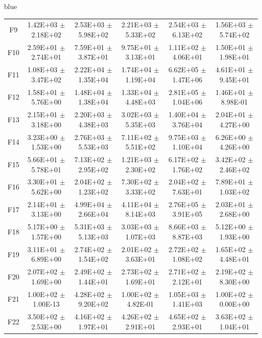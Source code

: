 \documentclass[journal, onecolumn]{IEEEtran}
\begin{document}
\begin{color}{blue}
\begin{table}[htbp!]
\begin{tabular}{c|ccccc}
		F9	 &	1.42E+03	$\pm$	2.18E+02		 &	2.53E+03	$\pm$	5.98E+02		 &	2.21E+03	$\pm$	5.33E+02		 &	2.54E+03	$\pm$	6.13E+02		 &	1.56E+03	$\pm$	5.74E+02	\\
		F10	 &	2.59E+01	$\pm$	2.74E+01		 &	7.59E+01	$\pm$	3.87E+01		 &	9.75E+01	$\pm$	3.13E+01		 &	1.11E+02	$\pm$	4.06E+01		 &	1.50E+01	$\pm$	1.98E+01	\\
		F11	 &	1.08E+03	$\pm$	3.47E+02		 &	2.22E+04	$\pm$	1.35E+04		 &	1.74E+04	$\pm$	1.19E+04		 &	6.62E+05	$\pm$	1.47E+06		 &	4.61E+01	$\pm$	9.45E+01	\\
		F12	 &	1.58E+01	$\pm$	5.76E+00		 &	1.48E+04	$\pm$	1.38E+04		 &	1.33E+04	$\pm$	4.48E+03		 &	2.81E+05	$\pm$	1.04E+06		 &	1.46E+01	$\pm$	8.98E-01	\\
		F13	 &	2.15E+01	$\pm$	3.18E+00		 &	2.20E+03	$\pm$	4.38E+03		 &	3.02E+03	$\pm$	5.35E+03		 &	1.40E+04	$\pm$	3.76E+04		 &	2.04E+01	$\pm$	4.27E+00	\\
		F14	 &	3.23E+00	$\pm$	1.53E+00		 &	2.76E+03	$\pm$	5.53E+03		 &	7.11E+02	$\pm$	5.51E+02		 &	9.75E+03	$\pm$	1.10E+04		 &	6.26E+00	$\pm$	4.26E+00	\\
		F15	 &	5.66E+01	$\pm$	5.78E+01		 &	7.13E+02	$\pm$	2.95E+02		 &	1.21E+03	$\pm$	2.30E+02		 &	6.17E+02	$\pm$	1.76E+02		 &	3.42E+02	$\pm$	2.46E+02	\\
		F16	 &	3.30E+01	$\pm$	5.62E+00		 &	2.04E+02	$\pm$	1.23E+02		 &	7.30E+02	$\pm$	3.33E+02		 &	2.04E+02	$\pm$	7.63E+01		 &	7.89E+01	$\pm$	1.03E+02	\\
		F17	 &	2.14E+01	$\pm$	3.13E+00		 &	4.99E+04	$\pm$	2.66E+04		 &	4.11E+04	$\pm$	8.14E+03		 &	2.76E+05	$\pm$	3.91E+05		 &	2.03E+01	$\pm$	2.68E+00	\\
		F18	 &	5.17E+00	$\pm$	1.57E+00		 &	5.31E+03	$\pm$	5.13E+03		 &	3.03E+03	$\pm$	1.07E+03		 &	8.66E+03	$\pm$	8.87E+03		 &	5.12E+00	$\pm$	1.93E+00	\\
		F19	 &	3.11E+01	$\pm$	6.89E+00		 &	2.74E+02	$\pm$	1.54E+02		 &	2.01E+02	$\pm$	3.63E+01		 &	2.72E+02	$\pm$	1.08E+02		 &	1.65E+02	$\pm$	4.48E+01	\\
		F20	 &	2.07E+02	$\pm$	1.69E+00		 &	2.49E+02	$\pm$	1.44E+01		 &	2.73E+02	$\pm$	1.69E+01		 &	2.71E+02	$\pm$	2.12E+01		 &	2.19E+02	$\pm$	8.30E+00	\\
		F21	 &	1.00E+02	$\pm$	1.00E-13		 &	4.28E+02	$\pm$	9.20E+02		 &	1.00E+02	$\pm$	4.82E-01		 &	1.05E+03	$\pm$	1.41E+03		 &	1.00E+02	$\pm$	0.00E+00	\\
		F22	 &	3.50E+02	$\pm$	2.53E+00		 &	4.16E+02	$\pm$	1.97E+01		 &	4.26E+02	$\pm$	2.91E+01		 &	4.65E+02	$\pm$	2.93E+01		 &	3.63E+02	$\pm$	1.04E+01	\\

\end{tabular}
\end{table}
\end{color}
\end{document}
